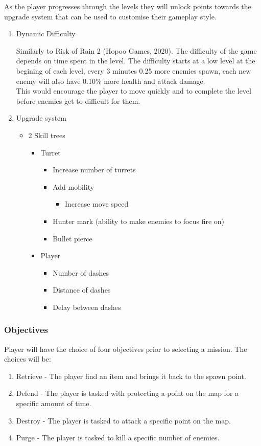\documentclass{article}
\begin{document}
As the player progresses through the levels they will unlock points towards the upgrade system that can be used to customise their gameplay style.
\begin{enumerate}
\item Dynamic Difficulty
\label{sec:orgccc6bbc}

Similarly to Risk of Rain 2 (Hopoo Games, 2020).
The difficulty of the game depends on time spent in the level.
The difficulty starts at a low level at the begining of each level, every 3 minutes 0.25 more enemies spawn, each new enemy will also have 0.10\% more health and attack damage. \\[0pt]

This would encourage the player to move quickly and to complete the level before enemies get to difficult for them.
\item Upgrade system
\label{sec:orgd2a7426}
\begin{itemize}
\item 2 Skill trees
\begin{itemize}
\item Turret
\begin{itemize}
\item Increase number of turrets
\item Add mobility
\begin{itemize}
\item Increase move speed
\end{itemize}
\item Hunter mark (ability to make enemies to focus fire on)
\item Bullet pierce
\end{itemize}
\item Player
\begin{itemize}
\item Number of dashes
\item Distance of dashes
\item Delay between dashes
\end{itemize}
\end{itemize}
\end{itemize}
\end{enumerate}
\subsubsection{Objectives}
\label{sec:orgb13ab08}
Player will have the choice of four objectives prior to selecting a mission.
The choices will be:
\begin{enumerate}
\item Retrieve - The player find an item and brings it back to the spawn point.
\item Defend - The player is tasked with protecting a point on the map for a specific amount of time.
\item Destroy - The player is tasked to attack a specific point on the map.
\item Purge - The player is tasked to kill a specific number of enemies.
\end{enumerate}
\end{document}
